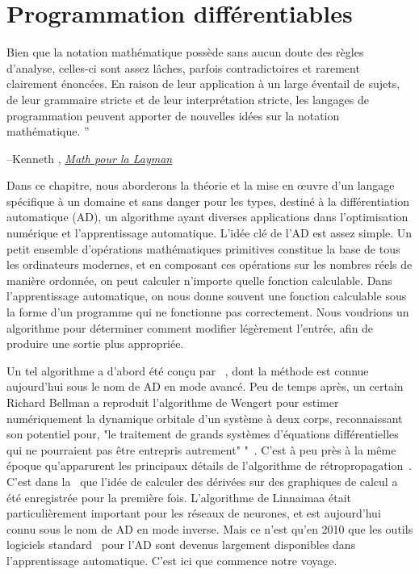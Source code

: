 \chapter{Programmation différentiables}\label{ch:kotlingrad}

\setlength{\epigraphwidth}{0.86\textwidth}
\epigraph{Bien que la notation mathématique possède sans aucun doute des règles d'analyse, celles-ci sont assez lâches, parfois contradictoires et rarement clairement énoncées. En raison de leur application à un large éventail de sujets, de leur grammaire stricte et de leur interprétation stricte, les langages de programmation peuvent apporter de nouvelles idées sur la notation mathématique. ''}{\begin{flushright}--Kenneth \citet{iverson1999math}, \href{https://www.cs.trinity.edu/About/The_Courses/cs301/math-for-the-layman/}{\textit{Math pour la Layman}}\end{flushright}}

Dans ce chapitre, nous aborderons la théorie et la mise en œuvre d'un langage spécifique à un domaine et sans danger pour les types, destiné à la différentiation automatique (AD), un algorithme ayant diverses applications dans l'optimisation numérique et l'apprentissage automatique. L'idée clé de l'AD est assez simple. Un petit ensemble d'opérations mathématiques primitives constitue la base de tous les ordinateurs modernes, et en composant ces opérations sur les nombres réels de manière ordonnée, on peut calculer n'importe quelle fonction calculable. Dans l'apprentissage automatique, on nous donne souvent une fonction calculable sous la forme d'un programme qui ne fonctionne pas correctement. Nous voudrions un algorithme pour déterminer comment modifier légèrement l'entrée, afin de produire une sortie plus appropriée.

Un tel algorithme a d'abord été conçu par ~\citet{wengert1964simple}, dont la méthode est connue aujourd'hui sous le nom de AD en mode avancé. Peu de temps après, un certain Richard Bellman a reproduit l'algorithme de Wengert pour estimer numériquement la dynamique orbitale d'un système à deux corps, reconnaissant son potentiel pour, "le traitement de grands systèmes d'équations différentielles qui ne pourraient pas être entrepris autrement" "~\citep{bellman1965wengert}. C'est à peu près à la même époque qu'apparurent les principaux détails de l'algorithme de rétropropagation~\citep{dreyfus1990artificial}. C'est dans la~\citet{linnainmaa1970representation} que l'idée de calculer des dérivées sur des graphiques de calcul a été enregistrée pour la première fois. L'algorithme de Linnaimaa était particulièrement important pour les réseaux de neurones, et est aujourd'hui connu sous le nom de AD en mode inverse. Mais ce n'est qu'en 2010 que les outils logiciels standard~\citep{bergstra2010theano} pour l'AD sont devenus largement disponibles dans l'apprentissage automatique. C'est ici que commence notre voyage.

